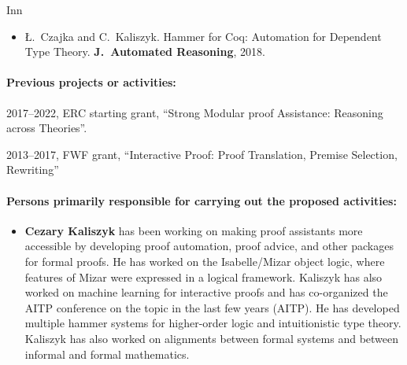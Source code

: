 \begin{sitedescription}{Inn}
\begin{itemize}
\item
Ł.~Czajka and C.~Kaliszyk.
\newblock Hammer for Coq: Automation for Dependent Type Theory.
\textbf{J.~Automated Reasoning}, 2018.
\end{itemize}

\paragraph*{Previous projects or activities:}

\begin{compactitem}
\item 2017--2022, ERC starting grant, ``Strong Modular proof Assistance: Reasoning across Theories''.
\item 2013--2017, FWF grant, ``Interactive Proof: Proof Translation, Premise Selection, Rewriting''
\end{compactitem}




\paragraph*{Persons primarily responsible for carrying out the proposed activities:}

\begin{itemize}
\item \textbf{Cezary Kaliszyk} has been working on making proof assistants
more accessible by developing proof automation, proof advice, and other packages for formal
proofs. He has worked on the Isabelle/Mizar object logic, where features of Mizar were
expressed in a logical framework. Kaliszyk has also worked on machine learning for interactive
proofs and has co-organized the AITP conference on the topic in the last few years (AITP). He
has developed multiple hammer systems for higher-order logic and intuitionistic type theory.
Kaliszyk has also worked on alignments between formal systems and between informal and formal
mathematics.
\end{itemize}



\end{sitedescription}

